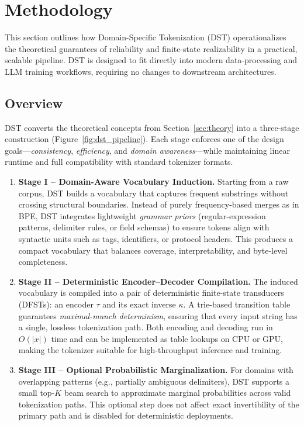 \section{Methodology}
\label{sec:method}

This section outlines how Domain-Specific Tokenization (DST) operationalizes the theoretical guarantees of reliability and finite-state realizability in a practical, scalable pipeline.
DST is designed to fit directly into modern data-processing and LLM training workflows, requiring no changes to downstream architectures.

\subsection{Overview}

DST converts the theoretical concepts from Section~\ref{sec:theory} into a three-stage construction (Figure~\ref{fig:dst_pipeline}).
Each stage enforces one of the design goals—\emph{consistency}, \emph{efficiency}, and \emph{domain awareness}—while maintaining linear runtime and full compatibility with standard tokenizer formats.

\begin{enumerate}
  \item \textbf{Stage I – Domain-Aware Vocabulary Induction.}
  Starting from a raw corpus, DST builds a vocabulary that captures frequent substrings without crossing structural boundaries.
  Instead of purely frequency-based merges as in BPE, DST integrates lightweight \emph{grammar priors} (regular-expression patterns, delimiter rules, or field schemas) to ensure tokens align with syntactic units such as tags, identifiers, or protocol headers.
  This produces a compact vocabulary that balances coverage, interpretability, and byte-level completeness.

  \item \textbf{Stage II – Deterministic Encoder–Decoder Compilation.}
  The induced vocabulary is compiled into a pair of deterministic finite-state transducers (DFSTs): an encoder $\tau$ and its exact inverse $\kappa$.
  A trie-based transition table guarantees \emph{maximal-munch determinism}, ensuring that every input string has a single, lossless tokenization path.
  Both encoding and decoding run in $O(|x|)$ time and can be implemented as table lookups on CPU or GPU, making the tokenizer suitable for high-throughput inference and training.

  \item \textbf{Stage III – Optional Probabilistic Marginalization.}
  For domains with overlapping patterns (e.g., partially ambiguous delimiters), DST supports a small top-$K$ beam search to approximate marginal probabilities across valid tokenization paths.
  This optional step does not affect exact invertibility of the primary path and is disabled for deterministic deployments.
\end{enumerate}

